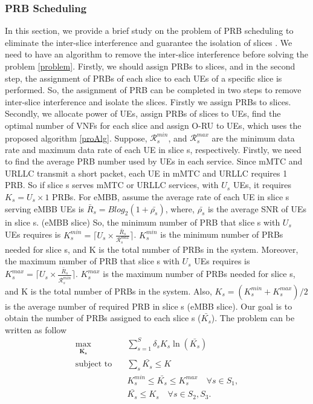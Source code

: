 \documentclass[lettersize,journal]{IEEEtran}
\begin{document}
\subsubsection{PRB Scheduling}\label{prb}
 In this section, we provide a brief study on the problem of PRB scheduling to eliminate  the inter-slice interference and guarantee the isolation of slices \cite{marabissi2019highly}.
We need to have an algorithm to remove the inter-slice interference before solving the problem \ref{problem}. Firstly, we should assign PRBs to slices, and in the second step, the assignment of PRBs of each slice to each UEs of a specific slice is performed. So, the assignment of PRB can be completed in two steps to remove inter-slice interference and isolate the slices. Firstly we assign PRBs to slices. Secondly, we allocate power of UEs, assign PRBs of slices to UEs, find the optimal number of VNFs for each slice and assign O-RU to UEs, which uses the proposed algorithm \ref{proAlg}.
Suppose, $\mathcal{R}_{{s}}^{min}$, and $\mathcal{R}_{{s}}^{max}$ are the minimum data rate and maximum data rate of each UE in slice s, respectively.
Firstly, we need to find the average PRB number used by UEs in each service. Since mMTC and URLLC transmit a short packet, each UE in mMTC and URLLC requires 1 PRB. So if slice s serves mMTC or URLLC services, with $U_s$ UEs, it requires $K_s = U_s \times 1$ PRBs. For eMBB, assume the average rate of each UE in slice s serving eMBB UEs is $\bar{R}_s = Blog_2(1 + \bar{\rho_s})$, where, $\bar{\rho_s}$ is the average SNR of UEs in slice s. (eMBB slice)
So, the minimum number of PRB that slice s with $U_s$ UEs requires is $K_s^{min} = \lceil{U_s \times \frac{\bar{R}_s}{\mathcal{R}_{{s}}^{max}}}\rceil$. $K_s^{min} $ is the minimum number of PRBs needed for slice s, and K is the total number of PRBs in the system.
Moreover, the maximum number of PRB that slice s with $U_s$ UEs requires is $K_s^{max} = \lceil{U_s \times \frac{\bar{R}_s}{\mathcal{R}_{{s}}^{min}}}\rceil$. $K_s^{max} $ is the maximum number of PRBs needed for slice s, and K is the total number of PRBs in the system. Also, $K_s = (K_s^{min}+K_s^{max})/2$ is the average number of required PRB in slice s (eMBB slice).
Our goal is to obtain the number of PRBs assigned to each slice s ($\bar{K_s}$).
The problem can be written as follow
\begin{subequations}\label{prob:prb}
\begin{alignat}{4}
\max\limits_{\boldsymbol{\bar{K_s}}} \quad &  \sum_{s=1}^{S}\delta_s K_s \ln(\bar{K_s}) \ \\
\text{subject to} \quad  & \sum_s{\bar{K_s}} \leq K
 \label{prb0} \\
& K_s^{min} \leq \bar{K_s}  \leq K_s^{max}  \quad \forall s \in S_1,\label{prb1} \\
&  \bar{K_s} \leq K_s  \quad \forall s \in S_2, S_3.\label{prb2}
\end{alignat}
\label{constraints}
\end{subequations}
\end{document}
